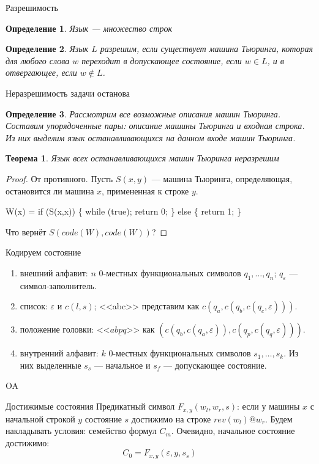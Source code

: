 \documentclass[aspectratio=169]{beamer}
\newtheorem{thm}{Теорема}[section]
\newtheorem{dfn}{Определение}[section]
\begin{document}
\begin{frame}{Разрешимость}
\begin{dfn}Язык --- множество строк\end{dfn}
\begin{dfn}Язык $L$ разрешим, если существует машина Тьюринга, которая для любого слова $w$ переходит в допускающее состояние, если $w \in L$,
и в отвергающее, если $w \notin L$.\end{dfn}
\end{frame}

\begin{frame}{Неразрешимость задачи останова}
\begin{dfn}Рассмотрим все возможные описания машин Тьюринга. Составим упорядоченные пары: описание машины Тьюринга и входная строка.
Из них выделим язык останавливающихся на данном входе машин Тьюринга.\end{dfn}
\begin{thm}Язык всех останавливающихся машин Тьюринга неразрешим\end{thm}
\begin{proof}От противного. Пусть $S(x,y)$ --- машина Тьюринга, определяющая, остановится ли машина $x$, примененная к строке $y$.\pause
\begin{center}W(x) = if (S(x,x)) \{ while (true); return 0; \} else \{ return 1; \}\end{center}\pause
Что вернёт $S(code(W),code(W))$?
\end{proof}
\end{frame}

\begin{frame}{Кодируем состояние}
\begin{enumerate}
\item внешний алфавит: $n$ 0-местных функциональных символов $q_1, \dots, q_n$; $q_\varepsilon$ --- символ-заполнитель.
\item список: $\varepsilon$ и $c(l,s)$; <<abc>> представим как $c(q_a,c(q_b,c(q_c,\varepsilon)))$.
\item положение головки: <<$ab\underline{p}q$>> как $(c(q_b,c(q_a,\varepsilon)), c(q_p,c(q_q,\varepsilon)))$.
\item внутренний алфавит: $k$ 0-местных функциональных символов $s_1, \dots, s_k$. Из них выделенные $s_s$ --- начальное и
$s_f$ --- допускающее состояние.
\end{enumerate}
\end{frame}
OA
\begin{frame}{Достижимые состояния}
Предикатный символ $F_{x,y}(w_l,w_r,s)$: если у машины $x$ с начальной строкой $y$ состояние $s$ достижимо на строке $rev(w_l) @ w_r$. 
\pause
Будем накладывать условия: семейство формул $C_m$. \pause
Очевидно, начальное состояние достижимо:
$$C_0 = F_{x,y}(\varepsilon,y,s_s)$$
\end{frame}
\end{document}
